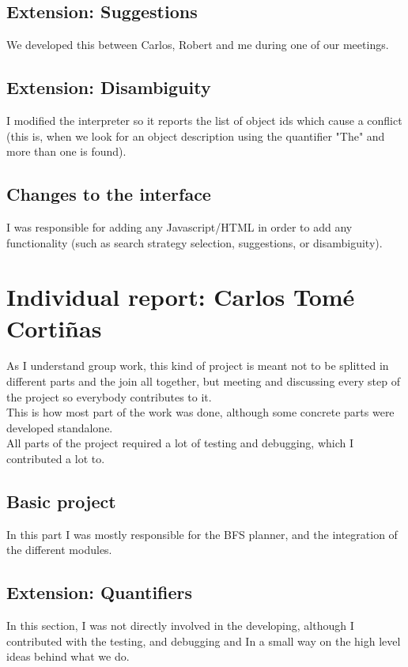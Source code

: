 \documentclass[11pt]{article}
\begin{document}
\subsection{Extension: Suggestions}

We developed this between Carlos, Robert and me during one of our meetings.

\subsection{Extension: Disambiguity}

I modified the interpreter so it reports the list of object ids which cause a conflict (this is, 
when we look for an object description using the quantifier "The" and more than one is found).

\subsection{Changes to the interface}

I was responsible for adding any Javascript/HTML in order to add any functionality (such as search strategy selection, suggestions, or disambiguity). 

\section{Individual report: Carlos Tomé Cortiñas}
As I understand group work, this kind of project is meant not to be splitted 
in different parts and the join all together, but meeting and discussing every step
of the project so everybody contributes to it.  \\

This is how most part of the work was done, although some concrete parts were 
developed standalone.  \\

All parts of the project required a lot of testing and debugging, which I 
contributed a lot to.  \\

\subsection{Basic project}
In this part I was mostly responsible for the BFS planner, and the integration 
of the different modules. \\

\subsection{Extension: Quantifiers}
In this section, I was not directly involved in the developing, although I 
contributed with the testing, and debugging and In a small way on the high 
level ideas behind what we do.  \\
\end{document}
